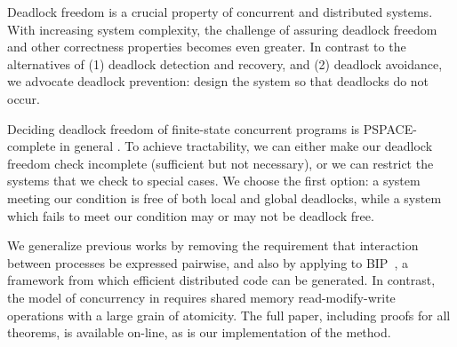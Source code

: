 
Deadlock freedom is a crucial property of concurrent and
distributed systems. With increasing system complexity,
the challenge of assuring deadlock freedom and other correctness
properties becomes even greater.
In contrast to the alternatives of (1) deadlock detection and recovery,
and (2) deadlock avoidance, we advocate deadlock prevention:
design the system so that deadlocks do not occur.

Deciding deadlock freedom
of finite-state concurrent programs is PSPACE-complete in general
\cite[chapter 19]{papadimitriou1994computational}. To achieve
tractability, we can either make our deadlock freedom check
incomplete (sufficient but not necessary), or we 
can restrict the systems that we
check to special cases.  We choose the first option: a system
meeting our condition is free of both local and global
deadlocks, while a
system which fails to meet our condition may or may not be
deadlock free.

We generalize previous works \cite{Att99a,AC05,AE98} by removing
the requirement that interaction between processes be expressed pairwise, 
and also by applying to BIP~\cite{bip06}, a framework from which efficient
distributed code can be generated. In contrast, the model of concurrency
in \cite{Att99a,AC05,AE98} requires shared memory
read-modify-write operations with a large grain of atomicity.
%
The full paper, including proofs for all theorems, is
available on-line, as is our implementation of the method.

